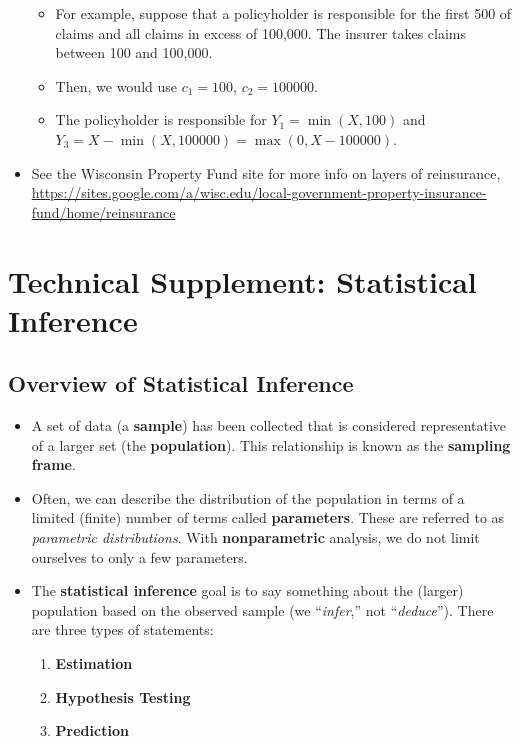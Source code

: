 \documentclass[]{book}
\begin{document}
\begin{itemize}
  \begin{itemize}
  \item
    For example, suppose that a policyholder is responsible for the
    first 500 of claims and all claims in excess of 100,000. The insurer
    takes claims between 100 and 100,000.
  \item
    Then, we would use \(c_1 = 100\), \(c_2 =100000\).
  \item
    The policyholder is responsible for \(Y_1 =\min(X,100)\) and
    \(Y_3 = X - \min(X,100000) = \max(0, X-100000)\).
  \end{itemize}
\item
  See the Wisconsin Property Fund site for more info on layers of
  reinsurance,
  \url{https://sites.google.com/a/wisc.edu/local-government-property-insurance-fund/home/reinsurance}
\end{itemize}

\chapter{Technical Supplement: Statistical
Inference}\label{technical-supplement-statistical-inference}

\section{Overview of Statistical
Inference}\label{overview-of-statistical-inference}

\begin{itemize}
\item
  A set of data (a \textbf{sample}) has been collected that is
  considered representative of a larger set (the \textbf{population}).
  This relationship is known as the \textbf{sampling frame}.
\item
  Often, we can describe the distribution of the population in terms of
  a limited (finite) number of terms called \textbf{parameters}. These
  are referred to as \emph{parametric distributions}. With
  \textbf{nonparametric} analysis, we do not limit ourselves to only a
  few parameters.
\item
  The \textbf{statistical inference} goal is to say something about the
  (larger) population based on the observed sample (we ``\emph{infer},''
  not ``\emph{deduce}''). There are three types of statements:

  \begin{enumerate}
  \def\labelenumi{\arabic{enumi}.}
  \item
    \textbf{Estimation}
  \item
    \textbf{Hypothesis Testing}
  \item
    \textbf{Prediction}
  \end{enumerate}
\end{itemize}
\end{document}
